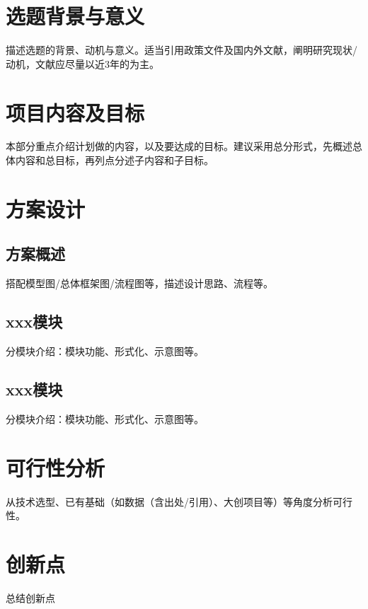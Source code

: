 \documentclass{style/course-report}
\begin{document}
\makecover


\section{选题背景与意义}

描述选题的背景、动机与意义。适当引用政策文件\cite{YunNan}及国内外文献\cite{Chen2025IoVCrowdsensing,JTBH202106001}，阐明研究现状/动机，文献应尽量以近3年的为主。




\section{项目内容及目标}

本部分重点介绍计划做的内容，以及要达成的目标。建议采用总分形式，先概述总体内容和总目标，再列点分述子内容和子目标。


\section{方案设计}

\subsection{方案概述}
搭配模型图/总体框架图/流程图等，描述设计思路、流程等。


\subsection{xxx模块}
分模块介绍：模块功能、形式化、示意图等。


\subsection{xxx模块}
分模块介绍：模块功能、形式化、示意图等。



\section{可行性分析}

从技术选型、已有基础（如数据（含出处/引用）、大创项目等）等角度分析可行性。

\section{创新点}

总结创新点
\end{document}
